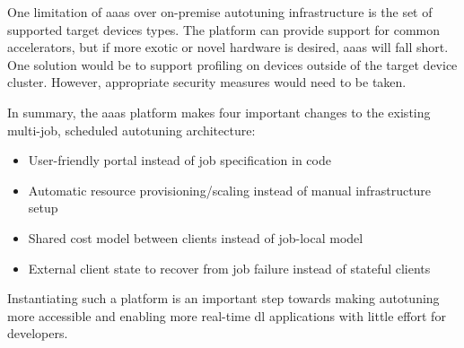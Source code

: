One limitation of \gls{aaas} over on-premise autotuning infrastructure is the set of supported target devices types. The platform can provide support for common accelerators, but if more exotic or novel hardware is desired, \gls{aaas} will fall short. One solution would be to support profiling on devices outside of the target device cluster. However, appropriate security measures would need to be taken.

In summary, the \gls{aaas} platform makes four important changes to the existing multi-job, scheduled autotuning architecture:
\begin{itemize}
	\item User-friendly portal instead of job specification in code
	\item Automatic resource provisioning/scaling instead of manual infrastructure setup
	\item Shared cost model between clients instead of job-local model
	\item External client state to recover from job failure instead of stateful clients
\end{itemize}
Instantiating such a platform is an important step towards making autotuning more accessible and enabling more real-time \gls{dl} applications with little effort for developers.